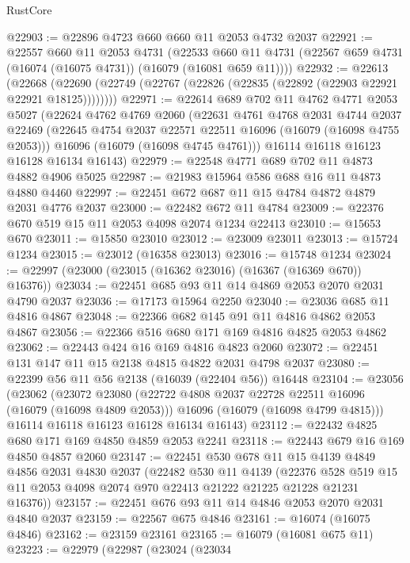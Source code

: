 \begin{lexlean}{RustCore}
\begin{coremodule}
@22903 := @22896 @4723 @660 @660 @11 @2053 @4732 @2037
@22921 := @22557
    @660
    @11
    @2053
    @4731
    (@22533 @660 @11 @4731 (@22567 @659 @4731 (@16074 (@16075 @4731)) (@16079 (@16081 @659 @11))))
@22932 := @22613
    (@22668 (@22690 (@22749 (@22767 (@22826 (@22835 (@22892 (@22903 @22921 @22921 @18125))))))))
@22971 := @22614
    @689
    @702
    @11
    @4762
    @4771
    @2053
    @5027
    (@22624
      @4762
      @4769
      @2060
      (@22631
        @4761
        @4768
        @2031
        @4744
        @2037
        @22469
        (@22645 @4754 @2037 @22571 @22511 @16096 (@16079 (@16098 @4755 @2053)))
        @16096
        (@16079 (@16098 @4745 @4761)))
      @16114
      @16118
      @16123
      @16128
      @16134
      @16143)
@22979 := @22548 @4771 @689 @702 @11 @4873 @4882 @4906 @5025
@22987 := @21983 @15964 @586 @688 @16 @11 @4873 @4880 @4460
@22997 := @22451 @672 @687 @11 @15 @4784 @4872 @4879 @2031 @4776 @2037
@23000 := @22482 @672 @11 @4784
@23009 := @22376 @670 @519 @15 @11 @2053 @4098 @2074 @1234 @22413
@23010 := @15653 @670
@23011 := @15850 @23010
@23012 := @23009 @23011
@23013 := @15724 @1234
@23015 := @23012 (@16358 @23013)
@23016 := @15748 @1234
@23024 := @22997 (@23000 (@23015 (@16362 @23016) (@16367 (@16369 @670)) @16376))
@23034 := @22451 @685 @93 @11 @14 @4869 @2053 @2070 @2031 @4790 @2037
@23036 := @17173 @15964 @2250
@23040 := @23036 @685 @11 @4816 @4867
@23048 := @22366 @682 @145 @91 @11 @4816 @4862 @2053 @4867
@23056 := @22366 @516 @680 @171 @169 @4816 @4825 @2053 @4862
@23062 := @22443 @424 @16 @169 @4816 @4823 @2060
@23072 := @22451 @131 @147 @11 @15 @2138 @4815 @4822 @2031 @4798 @2037
@23080 := @22399 @56 @11 @56 @2138 (@16039 (@22404 @56)) @16448
@23104 := @23056
    (@23062
      (@23072
        @23080
        (@22722 @4808 @2037 @22728 @22511 @16096 (@16079 (@16098 @4809 @2053)))
        @16096
        (@16079 (@16098 @4799 @4815)))
      @16114
      @16118
      @16123
      @16128
      @16134
      @16143)
@23112 := @22432 @4825 @680 @171 @169 @4850 @4859 @2053 @2241
@23118 := @22443 @679 @16 @169 @4850 @4857 @2060
@23147 := @22451
    @530
    @678
    @11
    @15
    @4139
    @4849
    @4856
    @2031
    @4830
    @2037
    (@22482
      @530
      @11
      @4139
      (@22376 @528 @519 @15 @11 @2053 @4098 @2074 @970 @22413 @21222 @21225 @21228 @21231 @16376))
@23157 := @22451 @676 @93 @11 @14 @4846 @2053 @2070 @2031 @4840 @2037
@23159 := @22567 @675 @4846
@23161 := @16074 (@16075 @4846)
@23162 := @23159 @23161
@23165 := @16079 (@16081 @675 @11)
@23223 := @22979
    (@22987
      (@23024
        (@23034

\end{coremodule}
\end{lexlean}
